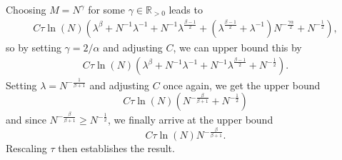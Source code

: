 \documentclass[letterpaper]{article} %
\newcommand{\R}{\mathbb{R}}
\newcommand{\Rp}{\R_{> 0}}
\begin{document}
Choosing $M=N^\gamma$ for some $\gamma\in\Rp$ leads to
\begin{align*}
    C \tau \ln(N)\left(\lambda^\beta + N^{-1} \lambda^{-1} + N^{-1}\lambda^{\frac{\beta-1}{2}} + (\lambda^{\frac{\beta-1}{2}}+\lambda^{-1})N^{-\frac{\gamma\alpha}{2}} + N^{-\frac12} \right),
\end{align*}
so by setting $\gamma=2/\alpha$ and adjusting $C$, we can upper bound this by
\begin{align*}
    C \tau \ln(N)\left(\lambda^\beta + N^{-1} \lambda^{-1} + N^{-1}\lambda^{\frac{\beta-1}{2}} + N^{-\frac12} \right).
\end{align*}
Setting $\lambda=N^{-\frac{1}{\beta+1}}$ and adjusting $C$ once again, we get the upper bound
\begin{equation*}
     C \tau \ln(N) \left( N^{-\frac{\beta}{\beta+1}} + N^{-\frac12} \right)
\end{equation*}
and since $N^{-\frac{\beta}{\beta+1}} \geq N^{-\frac12}$, we finally arrive at the upper bound
\begin{equation*}
    C \tau \ln(N) N^{-\frac{\beta}{\beta+1}}.
\end{equation*}
Rescaling $\tau$ then establishes the result.
\end{document}

